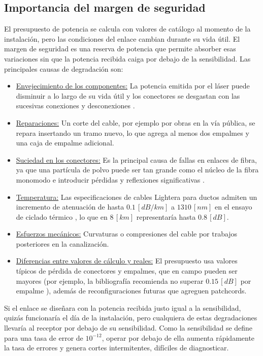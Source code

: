\subsection{Importancia del margen de seguridad}
\label{sec_5.3}
El presupuesto de potencia se calcula con valores de catálogo al momento de la instalación, pero las condiciones del enlace cambian durante su vida útil. El margen de seguridad es una reserva de potencia que permite absorber esas variaciones sin que la potencia recibida caiga por debajo de la sensibilidad. Las principales causas de degradación son:
\begin{itemize}
    \item \underline{Envejecimiento de los componentes:} La potencia emitida por el láser puede disminuir a lo largo de su vida útil y los conectores se desgastan con las sucesivas conexiones y desconexiones \cite{b7}.
    \item \underline{Reparaciones:} Un corte del cable, por ejemplo por obras en la vía pública, se repara insertando un tramo nuevo, lo que agrega al menos dos empalmes y una caja de empalme adicional.
    \item \underline{Suciedad en los conectores:} Es la principal causa de fallas en enlaces de fibra, ya que una partícula de polvo puede ser tan grande como el núcleo de la fibra monomodo e introducir pérdidas y reflexiones significativas \cite{b17}.
    \item \underline{Temperatura:} Las especificaciones de cables Lightera para ductos admiten un incremento de atenuación de hasta $0.1 \, [dB/km]$ a $1310 \, [nm]$ en el ensayo de ciclado térmico \cite{b8}, lo que en $8 \, [km]$ representaría hasta $0.8 \, [dB]$.
    \item \underline{Esfuerzos mecánicos:} Curvaturas o compresiones del cable por trabajos posteriores en la canalización.
    \item \underline{Diferencias entre valores de cálculo y reales:} El presupuesto usa valores típicos de pérdida de conectores y empalmes, que en campo pueden ser mayores (por ejemplo, la bibliografía recomienda no superar $0.15 \, [dB]$ por empalme \cite{b7}), además de reconfiguraciones futuras que agreguen patchcords.
\end{itemize}

Si el enlace se diseñara con la potencia recibida justo igual a la sensibilidad, quizás funcionaría el día de la instalación, pero cualquiera de estas degradaciones llevaría al receptor por debajo de su sensibilidad. Como la sensibilidad se define para una tasa de error de $10^{-12}$, operar por debajo de ella aumenta rápidamente la tasa de errores y genera cortes intermitentes, difíciles de diagnosticar.

